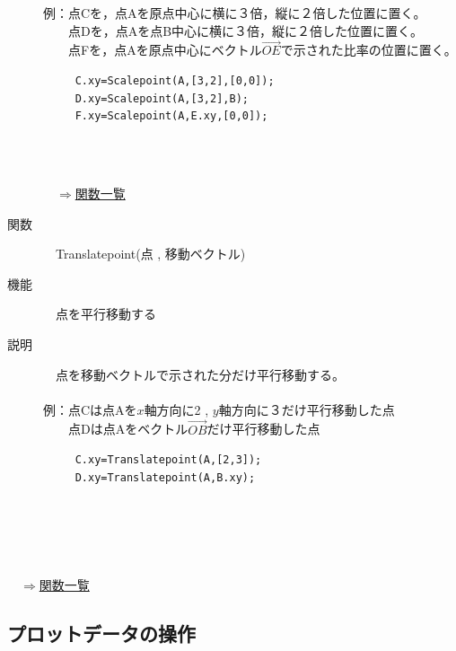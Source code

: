 \documentclass[papersize,a4paper,12pt,uplatex]{jsarticle}
\begin{document}
\begin{description}
例：点Cを，点Aを原点中心に横に３倍，縦に２倍した位置に置く。\\
　　点Dを，点Aを点B中心に横に３倍，縦に２倍した位置に置く。\\
　　点Fを，点Aを原点中心にベクトル$\overrightarrow{OE} $で示された比率の位置に置く。
\begin{verbatim}
　　　C.xy=Scalepoint(A,[3,2],[0,0]);
　　　D.xy=Scalepoint(A,[3,2],B);
　　　F.xy=Scalepoint(A,E.xy,[0,0]);
\end{verbatim}
　　　　　\\
　\\

\begin{flushright}　\hyperlink{functionlist}{$\Rightarrow$関数一覧}\end{flushright}

\hypertarget{translatepoint}{}
\item[関数]　Translatepoint(点 , 移動ベクトル)
\item[機能]　点を平行移動する
\item[説明]　点を移動ベクトルで示された分だけ平行移動する。\\
\\
例：点Cは点Aを$x$軸方向に2 , $y$軸方向に３だけ平行移動した点\\
　　点Dは点Aをベクトル$\overrightarrow{OB} $だけ平行移動した点
\begin{verbatim}
　　　C.xy=Translatepoint(A,[2,3]);
　　　D.xy=Translatepoint(A,B.xy);
\end{verbatim}
　\\
　　　　　
\end{description}
　\\

\begin{flushright}　\hyperlink{functionlist}{$\Rightarrow$関数一覧}\end{flushright}
\newpage
\subsection{プロットデータの操作}

\end{document}
